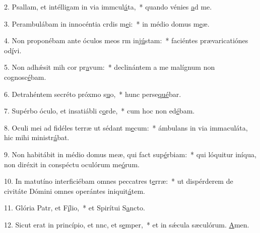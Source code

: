 2. Psallam, et intélligam in via immcul\uline{á}ta,~* quando vénies \uline{a}d me.\par 
3. Perambulábam in innocéntia crdis m\uline{e}i:~* in médio domus m\uline{e}æ.\par 
4. Non proponébam ante óculos meos rm inj\uline{ú}stam:~* faciéntes prævaricatiónes od\uline{í}vi.\par 
5. Non adhǽsit mih cor pr\uline{a}vum:~* declinántem a me malígnum non cognosc\uline{é}bam.\par 
6. Detrahéntem secréto próxmo s\uline{u}o,~* hunc perse\uline{qué}bar.\par 
7. Supérbo óculo, et insatiábli c\uline{o}rde,~* cum hoc non ed\uline{é}bam.\par 
8. Oculi mei ad fidéles terræ ut sédant m\uline{e}cum:~* ámbulans in via immaculáta, hic mihi ministr\uline{á}bat.\par 
9. Non habitábit in médio domus meæ, qui fact sup\uline{é}rbiam:~* qui lóquitur iníqua, non diréxit in conspéctu oculórum me\uline{ó}rum.\par 
10. In matutíno interficiébam omnes peccatres t\uline{e}rræ:~* ut dispérderem de civitáte Dómini omnes operántes iniquit\uline{á}tem.\par 
11. Glória Patr, et F\uline{í}lio,~* et Spirítui S\uline{a}ncto.\par 
12. Sicut erat in princípio, et nnc, et s\uline{e}mper,~* et in sǽcula sæculórum. \uline{A}men.\par 
